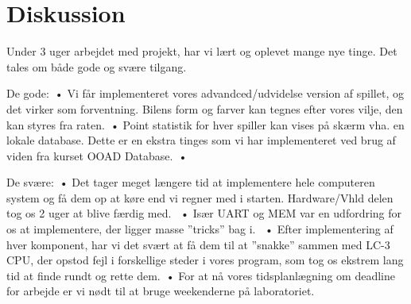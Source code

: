 \chapter{Diskussion}\label{cha:diskussion}
Under 3 uger arbejdet med projekt, har vi lært og oplevet mange nye tinge. Det tales om både gode og svære tilgang. \

De gode:\
•	Vi får implementeret vores advandced/udvidelse version af spillet, og det virker som forventning. Bilens form og farver kan tegnes efter vores vilje, den kan styres fra raten.\
•	Point statistik for hver spiller kan vises på skærm vha. en lokale database. Dette er en ekstra tinges som vi har implementeret ved brug af viden fra kurset OOAD Database.\
•	\

De svære:\
•	Det tager meget længere tid at implementere hele computeren system og få dem op at køre end vi regner med i starten. Hardware/Vhld delen tog os 2 uger at blive færdig med. \
•	Især UART og MEM var en udfordring for os at implementere, der ligger masse ”tricks” bag i. \
•	Efter implementering af hver komponent, har vi det svært at få dem til at ”snakke” sammen med LC-3 CPU, der opstod fejl i forskellige steder i vores program, som tog os ekstrem lang tid at finde rundt og rette dem.\
•	For at nå vores tidsplanlægning om deadline for arbejde er vi nødt til at bruge weekenderne på laboratoriet. \